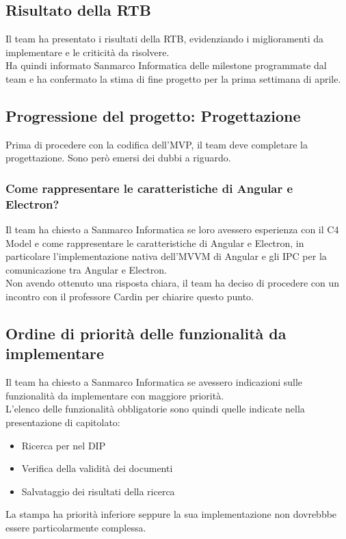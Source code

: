 \documentclass[a4paper,12pt]{article}
\begin{document}
\subsection{Risultato della RTB}
Il team ha presentato i risultati della RTB, evidenziando i miglioramenti da implementare e le criticità da risolvere.
\\Ha quindi informato Sanmarco Informatica delle milestone programmate dal team e ha confermato la stima di fine progetto per la prima settimana di aprile.

\subsection{Progressione del progetto: Progettazione}
Prima di procedere con la codifica dell'MVP, il team deve completare la progettazione. Sono però emersi dei dubbi a riguardo.
\subsubsection{Come rappresentare le caratteristiche di Angular e Electron?}
Il team ha chiesto a Sanmarco Informatica se loro avessero esperienza con il C4 Model e come rappresentare le caratteristiche di Angular e Electron, in particolare l'implementazione nativa dell'MVVM di Angular e gli IPC per la comunicazione tra Angular e Electron.
\\Non avendo ottenuto una risposta chiara, il team ha deciso di procedere con un incontro con il professore Cardin per chiarire questo punto.

\subsection{Ordine di priorità delle funzionalità da implementare}
Il team ha chiesto a Sanmarco Informatica se avessero indicazioni sulle funzionalità da implementare con maggiore priorità. 
\\L'elenco delle funzionalità obbligatorie sono quindi quelle indicate nella presentazione di capitolato:
\begin{itemize}[noitemsep]
    \item Ricerca per nel DIP
    \item Verifica della validità dei documenti
    \item Salvataggio dei risultati della ricerca
\end{itemize}
La stampa ha priorità inferiore seppure la sua implementazione non dovrebbbe essere particolarmente complessa.
\end{document}
